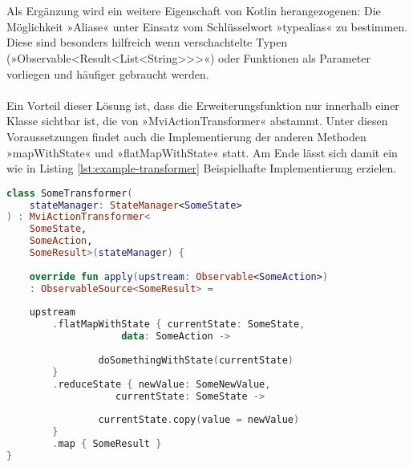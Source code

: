 \\\\
Als Ergänzung wird ein weitere Eigenschaft von Kotlin herangezogenen: Die Möglichkeit »Aliase« unter Einsatz vom Schlüsselwort »typealias« zu bestimmen. Diese sind besonders hilfreich wenn verschachtelte Typen (»Observable<Result<List<String>>>«) oder Funktionen als Parameter vorliegen und häufiger gebraucht werden.
\\\\
Ein Vorteil dieser Lösung ist, dass die Erweiterungsfunktion nur innerhalb einer Klasse sichtbar ist, die von »MviActionTransformer« abstammt. Unter diesen Voraussetzungen findet auch die Implementierung der anderen Methoden »mapWithState« und »flatMapWithState« statt. Am Ende lässt sich damit ein wie in Listing
\ref{lst:example-transformer}
Beispielhafte Implementierung erzielen. 
\begin{lstlisting}[caption={Beispiel Implementation}, label={lst:example-transformer},language=Kotlin]
class SomeTransformer(
	stateManager: StateManager<SomeState>
) : MviActionTransformer<
	SomeState,
	SomeAction,
	SomeResult>(stateManager) {
	
	override fun apply(upstream: Observable<SomeAction>)
	: ObservableSource<SomeResult> =
	
	upstream
		.flatMapWithState { currentState: SomeState,
					data: SomeAction ->
		
				doSomethingWithState(currentState)
		}
		.reduceState { newValue: SomeNewValue,
				   currentState: SomeState ->
		
				currentState.copy(value = newValue)
		}
		.map { SomeResult }
}
\end{lstlisting}


